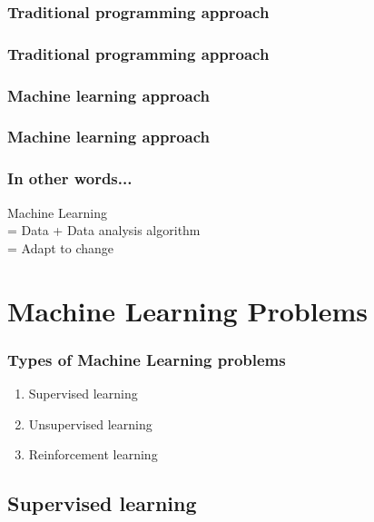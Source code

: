 \documentclass[aspectratio=169]{beamer}
\begin{document}
\subsubsection{Traditional programming approach}

\begin{frame}
	\frametitle{Traditional programming approach}
	\begin{center}
	\end{center}
\end{frame}


\subsubsection{Machine learning approach}

\begin{frame}
	\frametitle{Machine learning approach}
	\begin{center}
	\end{center}
\end{frame}

\begin{frame}
	\frametitle{In other words...}
	\begin{center}
		Machine Learning \\
		\onslide<2-> \huge = Data + Data analysis algorithm \\
		\onslide<3-> \Huge = Adapt to change
	\end{center}
\end{frame}

\section{Machine Learning Problems}

\begin{frame}
	\frametitle{Types of Machine Learning problems}
	\begin{enumerate}
		\item<2-> Supervised learning
		\item<3-> Unsupervised learning
		\item<4-> Reinforcement learning
	\end{enumerate}
\end{frame}

\subsection{Supervised learning}
\end{document}
